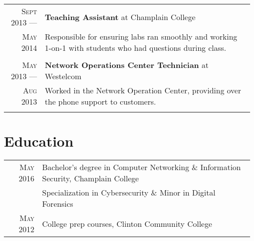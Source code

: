 \documentclass[a4paper,10pt]{article}
\begin{document}
\begin{tabular}{r|p{11cm}}
\textsc{Sept 2013} ---            & \textbf{Teaching Assistant} at Champlain College\\
\textsc{May 2014} \hphantom{---} & \footnotesize{ Responsible for ensuring labs ran smoothly and working 1-on-1 with students who had questions during class. 
         \vspace{-2mm}
        \vspace*{-\baselineskip}
    }\\
\multicolumn{2}{c}{} \\

\textsc{May 2013} ---            & \textbf{Network Operations Center Technician} at Westelcom\\
\textsc{Aug 2013} \hphantom{---} & \footnotesize{ Worked in the Network Operation Center, providing over the phone support to customers.
         \vspace{-2mm}
        \vspace*{-\baselineskip}
    }\\
\multicolumn{2}{c}{} \\

\end{tabular}

\section{Education}
\begin{tabular}{rl}
    \hspace{4mm}\textsc{May 2016} & \footnotesize{Bachelor's degree in  Computer Networking \& Information Security, Champlain College}\\
                          & \footnotesize{Specialization in Cybersecurity \& Minor in Digital Forensics}\\
    \hspace{4mm}\textsc{May 2012} & \footnotesize{College prep courses, Clinton Community College}\\
\end{tabular}
\end{document}
